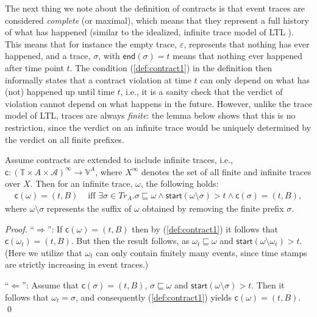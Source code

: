 \documentclass[orivec,final]{llncs-href}
\newcommand{\actionset}{\mathcal{A}}
\newcommand{\timeset}{\mathbb{T}}
\newcommand{\traceset}[1]{\mathit{Tr}_{#1}}
\newcommand{\verdictset}[1]{\mathbb{V}^{#1}}
\newcommand{\tracestart}{\mathsf{start}}
\newcommand{\traceend}{\mathsf{end}}
\newcommand{\trace}{\sigma}
\newcommand{\emptytrace}{\varepsilon}
\newcommand{\contract}{\mathsf{c}}
\begin{document}
The next thing we note about the definition of contracts is that event
traces are considered \emph{complete} (or maximal), which means that
they represent a full history of what has happened (similar to the
idealized, infinite trace model of LTL \cite{huthryan04lics}). This
means that for instance the empty trace, $\emptytrace$, represents
that nothing has ever happened, and a trace, $\trace$, with
$\traceend(\trace) = t$ means that nothing ever happened after time
point $t$. The condition (\ref{def:contract1}) in the definition then
informally states that a contract violation at time $t$ can only
depend on what has (not) happened up until time $t$, i.e., it is a
sanity check that the verdict of  violation cannot depend on what
happens in the future. However, unlike the trace model of LTL, traces
are always \emph{finite}: the lemma below shows that this is no 
restriction, since the verdict on an infinite trace would be uniquely
determined by the verdict on all finite prefixes.
\begin{lemma}
  Assume contracts are extended to include infinite traces, i.e.,
  $\contract: (\timeset \times A \times \actionset)^{\infty} \to
  \verdictset{A}$, where $X^\infty$ denotes the set of
  all finite and infinite traces over $X$. Then for an infinite trace,
  $\omega$, the following holds:
  \begin{align*}
    \contract(\omega) = (t,B) &\mbox{ iff } \exists \trace \in
    \traceset{A}. \trace \sqsubseteq \omega \land \tracestart(\omega
    \setminus \trace) > t \land \contract(\trace) = (t,B),
  \end{align*}
  where $\omega \setminus \trace$ represents the suffix of $\omega$ obtained
  by removing the finite prefix $\trace$.
\end{lemma}
\begin{proof}
  ``$\Rightarrow$'': If $\contract(\omega) = (t,B)$ then by
  (\ref{def:contract1}) it follows that $\contract(\omega_t) =
  (t,B)$. But then the result follows, as $\omega_t \sqsubseteq
  \omega$ and $\tracestart(\omega \setminus \omega_t) > t$. (Here we
  utilize that $\omega_t$ can only contain finitely many events, since
  time stamps are strictly increasing in event traces.) %
  
  ``$\Leftarrow$'': Assume that $\contract(\trace) = (t,B)$, $\trace
  \sqsubseteq \omega$ and $\tracestart(\omega \setminus \trace) >
  t$. Then it follows that $\omega_t = \trace$, and consequently
  (\ref{def:contract1}) yields $\contract(\omega) = (t,B)$.
  \qed
\end{proof}
\end{document}
